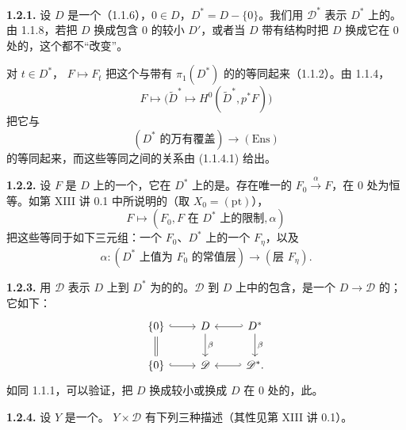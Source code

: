 \textbf{1.2.1.} 设 $D$ 是一个（1.1.6），$0\in D$，$D^*=D-\{0\}$。我们用 $\mathscr D^*$ 表示
$D^*$ 上的。由 1.1.8，若把 $D$ 换成包含 $0$ 的较小 $D'$，或者当 $D$ 带有结构时把 $D$ 换成它在 $0$ 处的，这个都不“改变”。

对 $t\in D^*$， $F\mapsto F_t$ 把这个与带有 $\pi_1(D^*)$ 的的等同起来（1.1.2）。由 1.1.4，
\[
 F\longmapsto\bigl(\widetilde D^*\longmapsto H^0(\widetilde D^*,p^*F)\bigr)
\]
把它与
\[
 (D^*\text{ 的万有覆盖})\longrightarrow(\mathrm{Ens})
\]
的等同起来，而这些等同之间的关系由 (1.1.4.1) 给出。

\textbf{1.2.2.} 设 $F$ 是 $D$ 上的一个，它在 $D^*$ 上的是。存在唯一的 $F_0\xrightarrow{\alpha}F$，在 $0$ 处为恒等。如第 XIII 讲 0.1 中所说明的（取 $X_0=(\mathrm{pt})$），
\[
 F\longmapsto(F_0,F\text{ 在 }D^*\text{ 上的限制},\alpha)
\]
把这些等同于如下三元组：一个 $F_0$、$D^*$ 上的一个 $F_\eta$，以及
\[
 \alpha:(D^*\text{ 上值为 }F_0\text{ 的常值层})\longrightarrow(\text{层 }F_\eta).
\]

\textbf{1.2.3.} 用 $\mathscr D$ 表示 $D$ 上到 $D^*$ 为的的。$\mathscr D$ 到 $D$ 上中的包含，是一个 $D\to\mathscr D$ 的；它如下：
\[
\begin{tikzcd}
\{0\}\arrow[r,hook]\arrow[d,equal]&D\arrow[d,"\beta"]&D^*\arrow[l,hook']\arrow[d,"\beta"]\\
\{0\}\arrow[r,hook]&\mathscr D&\mathscr D^*\arrow[l,hook'].
\end{tikzcd}
\]
如同 1.1.1，可以验证，把 $D$ 换成较小或换成 $D$ 在 $0$ 处的，此。

\textbf{1.2.4.} 设 $Y$ 是一个。 $Y\times\mathscr D$ 有下列三种描述（其性见第 XIII 讲 0.1）。

